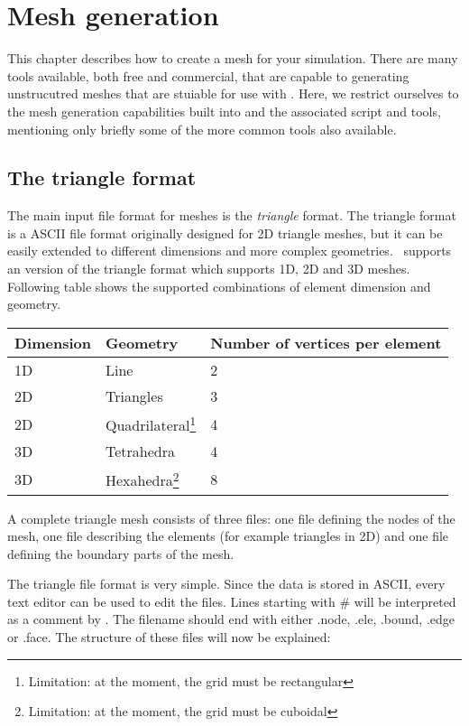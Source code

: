 \chapter{Mesh generation}\label{chap:meshes}

This chapter describes how to create a mesh for your \fluidity simulation. There
are many tools available, both free and commercial, that are capable to generating
unstrucutred meshes that are stuiable for use with \fluidity. Here, we restrict ourselves
to the mesh generation capabilities built into \fluidity and the associated script and
tools, mentioning only briefly some of the more common tools also available.


\section{The triangle format}\label{sect:triangle_format}

The main input file format for \fluidity meshes is the \emph{triangle} format.
The triangle format is a ASCII file format originally designed for 2D
triangle meshes, but it can be easily extended to different dimensions and
more complex geometries.  \fluidity\ supports an version of the triangle format
which supports 1D, 2D and 3D meshes.  Following table shows the supported
combinations of element dimension and geometry.

\begin{tabular}{ l l l }
\textbf{Dimension} & \textbf{Geometry} & \textbf{Number of vertices per element} \\ \hline
1D & Line & 2\\ 
2D & Triangles &  3 \\ 
2D & Quadrilateral\footnote{Limitation: at the moment, the grid must be rectangular} & 4 \\
3D & Tetrahedra & 4 \\ 
3D & Hexahedra\footnote{Limitation: at the moment, the grid must be cuboidal} & 8 \\
\end{tabular}

A complete triangle mesh consists of three files: one file defining the
nodes of the mesh, one file describing the elements (for example triangles
in 2D) and one file defining the boundary parts of the mesh.

The triangle file format is very simple. Since the data is stored in ASCII,
every text editor can be used to edit the files.  Lines starting with \# will
be interpreted as a comment by \fluidity.  The filename should end with
either .node, .ele, .bound, .edge or .face.  The structure of these files
will now be explained:

